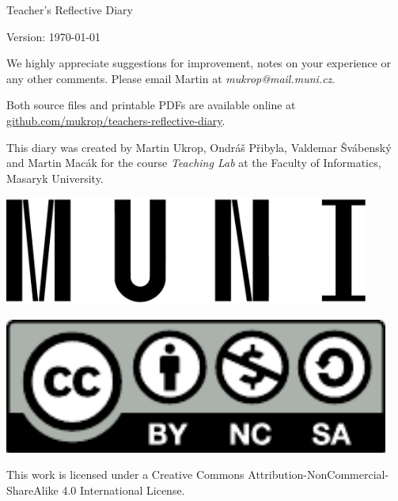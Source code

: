 \documentclass[twoside,openany]{book}
\begin{document}







\newpage
\vspace*{\fill}
Teacher's Reflective Diary

Version: \today

\bigskip
We highly appreciate suggestions for improvement, notes on your experience or any other comments. Please email Martin at \textit{mukrop@mail.muni.cz}.

Both source files and printable PDFs are available online at \url{github.com/mukrop/teachers-reflective-diary}.

\bigskip
\begin{minipage}{0.68\textwidth}
This diary was created by Martin Ukrop, Ondráš Přibyla, Valdemar Švábenský and Martin Macák for the course \textit{Teaching Lab} at the Faculty of Informatics, Masaryk University.
\end{minipage}
\begin{minipage}[t]{0.32\textwidth}
\hfill\includegraphics[width=0.90\textwidth]{../img/muni}
\end{minipage}

\begin{minipage}{0.32\textwidth}
\includegraphics[width=0.95\textwidth]{../img/cc-by-nc-sa}
\end{minipage}
\begin{minipage}{0.68\textwidth}
This work is licensed under a Creative Commons Attribution-NonCommercial-ShareAlike 4.0 International License.
\end{minipage}

\newpage
\thispagestyle{empty}
\mbox{}
\newpage
\thispagestyle{empty}
\mbox{}
\end{document}
